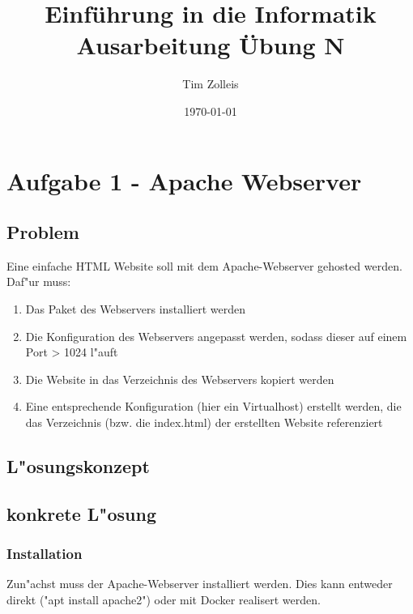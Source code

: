\documentclass[a4paper,11pt,titlepage]{article}
\begin{document}
    \title{Einf\"uhrung in die Informatik\\
    Ausarbeitung \"Ubung N}


    \author{Tim Zolleis}

    \date{\today}

    \maketitle{\thispagestyle{plain}}


    \section{Aufgabe 1 - Apache Webserver}

    \subsection{Problem}
    Eine einfache HTML Website soll mit dem Apache-Webserver gehosted werden. Daf"ur muss:
    \begin{enumerate}
        \item Das Paket des Webservers installiert werden
        \item Die Konfiguration des Webservers angepasst werden, sodass dieser auf einem Port > 1024 l"auft
        \item Die Website in das Verzeichnis des Webservers kopiert werden
        \item Eine entsprechende Konfiguration (hier ein Virtualhost) erstellt werden, die das Verzeichnis (bzw. die index.html) der erstellten Website referenziert
    \end{enumerate}

    \subsection{L"osungskonzept}

    \subsection{konkrete L"osung}

    \subsubsection{Installation}
    Zun"achst muss der Apache-Webserver installiert werden. Dies kann entweder direkt ("apt install apache2") oder mit Docker realisert werden.
\end{document}
